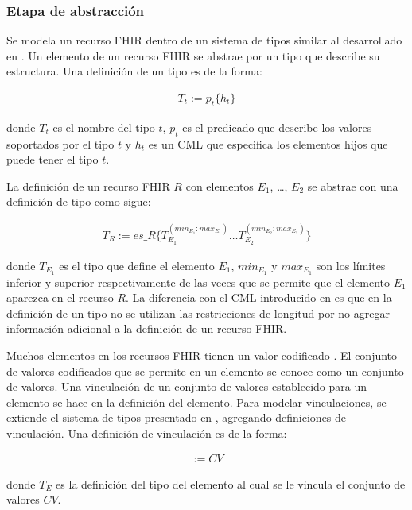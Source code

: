 \subsubsection{Etapa de abstracción}

Se modela un recurso FHIR dentro de un sistema de tipos similar al desarrollado en \cite{Maldonado09}. Un elemento de un recurso FHIR se abstrae por un tipo que describe su estructura. Una definición de un tipo es de la forma:

\begin{align*}
T_t:=p_t\{h_t\}
\end{align*}

donde \(T_t\) es el nombre del tipo \(t\), \(p_t\) es el predicado que describe los valores soportados por el tipo \(t\) y \(h_t\) es un CML que especifica los elementos hijos que puede tener el tipo \(t\).

La definición de un recurso FHIR \(R\) con elementos \(E_1\), \dots , \(E_2\) se abstrae con una definición de tipo como sigue:

\begin{align*}
T_R:=es\_R\{T_{E_1}^{(min_{E_1} \colon max_{E_1})} \dots T_{E_2}^{(min_{E_2} \colon max_{E_2})}\}
\end{align*}

donde \(T_{E_1}\) es el tipo que define el elemento \(E_1\), \(min_{E_1}\) y \(max_{E_1}\) son los límites inferior y superior respectivamente de las veces que se permite que el elemento \(E_1\) aparezca en el recurso \(R\). La diferencia con el CML introducido en \cite{Maldonado09} es que en la definición de un tipo no se utilizan las restricciones de longitud por no agregar información adicional a la definición de un recurso FHIR.

Muchos elementos en los recursos FHIR tienen un valor codificado \cite{FHIRTerminology}. El conjunto de valores codificados que se permite en un elemento se conoce como un conjunto de valores. Una vinculación de un conjunto de valores establecido para un elemento se hace en la definición del elemento. Para modelar vinculaciones, se extiende el sistema de tipos presentado en \cite{Maldonado09}, agregando definiciones de vinculación. Una definición de vinculación es de la forma:

\begin{align*}
[T_E] := CV
\end{align*}

donde \(T_E\) es la definición del tipo del elemento al cual se le vincula el conjunto de valores \(CV\).

